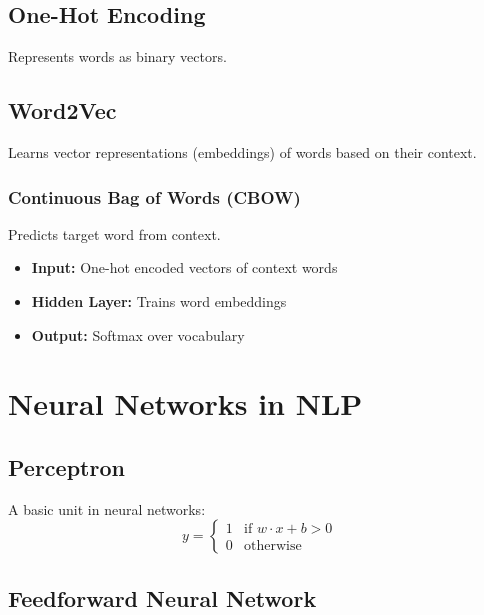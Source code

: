 \subsection{One-Hot Encoding}
Represents words as binary vectors.

\subsection{Word2Vec}
Learns vector representations (embeddings) of words based on their context.

\subsubsection{Continuous Bag of Words (CBOW)}
Predicts target word from context.

\begin{tcolorbox}[title=CBOW Architecture]
\begin{itemize}
    \item \textbf{Input:} One-hot encoded vectors of context words
    \item \textbf{Hidden Layer:} Trains word embeddings
    \item \textbf{Output:} Softmax over vocabulary
\end{itemize}
\end{tcolorbox}

\section{Neural Networks in NLP}
\subsection{Perceptron}
A basic unit in neural networks:
\[
y = \begin{cases}
1 & \text{if } w \cdot x + b > 0 \\
0 & \text{otherwise}
\end{cases}
\]

\subsection{Feedforward Neural Network}
\begin{center}
\end{center}

